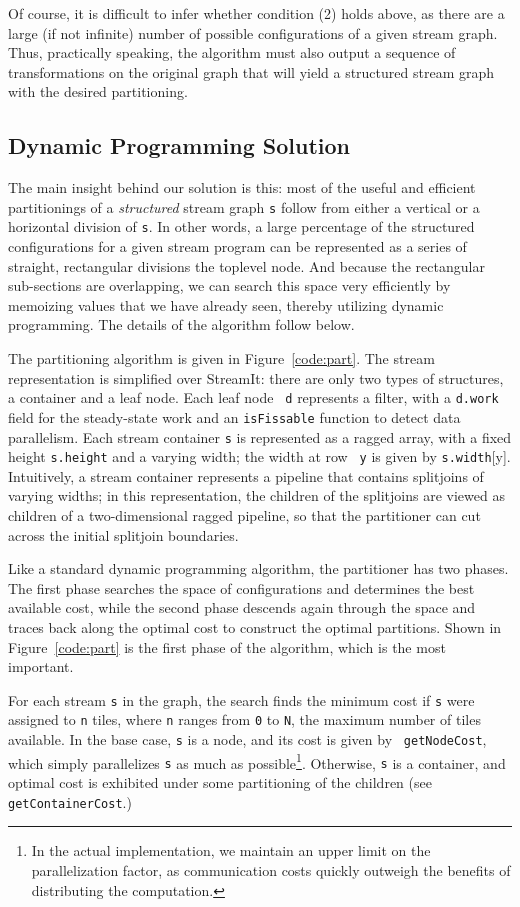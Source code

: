 Of course, it is difficult to infer whether condition (2) holds above,
as there are a large (if not infinite) number of possible
configurations of a given stream graph.  Thus, practically speaking,
the algorithm must also output a sequence of transformations on the
original graph that will yield a structured stream graph with the
desired partitioning.

\subsection{Dynamic Programming Solution}

The main insight behind our solution is this: most of the useful and
efficient partitionings of a {\it structured} stream graph {\tt s}
follow from either a vertical or a horizontal division of {\tt s}.  In
other words, a large percentage of the structured configurations for a
given stream program can be represented as a series of straight,
rectangular divisions the toplevel node.  And because the rectangular
sub-sections are overlapping, we can search this space very
efficiently by memoizing values that we have already seen, thereby
utilizing dynamic programming.  The details of the algorithm follow
below.

The partitioning algorithm is given in Figure~\ref{code:part}.  The
stream representation is simplified over StreamIt: there are only two
types of structures, a container and a leaf node.  Each leaf node {\tt
d} represents a filter, with a {\tt d.work} field for the steady-state
work and an {\tt isFissable} function to detect data parallelism.
Each stream container {\tt s} is represented as a ragged array, with a
fixed height {\tt s.height} and a varying width; the width at row {\tt
y} is given by {\tt s.width}[y].  Intuitively, a stream container
represents a pipeline that contains splitjoins of varying widths; in
this representation, the children of the splitjoins are viewed as
children of a two-dimensional ragged pipeline, so that the partitioner
can cut across the initial splitjoin boundaries.

Like a standard dynamic programming algorithm, the partitioner has two
phases.  The first phase searches the space of configurations and
determines the best available cost, while the second phase descends
again through the space and traces back along the optimal cost to
construct the optimal partitions.  Shown in Figure~\ref{code:part} is
the first phase of the algorithm, which is the most important.

For each stream {\tt s} in the graph, the search finds the minimum
cost if {\tt s} were assigned to {\tt n} tiles, where {\tt n} ranges
from {\tt 0} to {\tt N}, the maximum number of tiles available.  In
the base case, {\tt s} is a node, and its cost is given by {\tt
getNodeCost}, which simply parallelizes {\tt s} as much as
possible\footnote{In the actual implementation, we maintain an upper
limit on the parallelization factor, as communication costs quickly
outweigh the benefits of distributing the computation.}.  Otherwise,
{\tt s} is a container, and optimal cost is exhibited under some
partitioning of the children (see {\tt getContainerCost}.)


